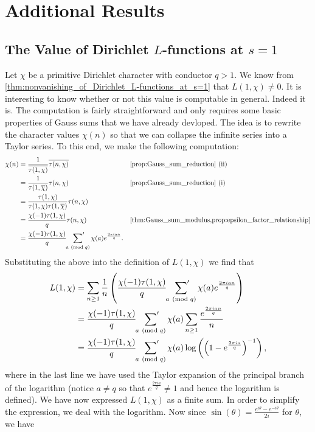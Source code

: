 \documentclass[12pt]{book}
\theoremstyle{definition}\newframedtheorem{method}{Method}
\newcommand{\psum}{\sideset{}{'}\sum}
\newcommand{\tmod}[1]{\ \left(\text{mod }#1\right)}
\renewcommand{\t}{\theta}
\newcommand{\<}{\langle}
\renewcommand{\>}{\rangle}
\newcommand{\conj}{\overline}
\newcommand{\cchi}{\conj{\chi}}
\begin{document}
  \section{Additional Results}
    \subsection*{The Value of Dirichlet \texorpdfstring{$L$}{L}-functions at \texorpdfstring{$s = 1$}{s = 1}}
      Let $\chi$ be a primitive Dirichlet character with conductor $q > 1$. We know from \cref{thm:nonvanishing_of_Dirichlet_L-functions_at_s=1} that $L(1,\chi) \neq 0$. It is interesting to know whether or not this value is computable in general. Indeed it is. The computation is fairly straightforward and only requires some basic properties of Gauss sums that we have already devloped. The idea is to rewrite the character values $\chi(n)$ so that we can collapse the infinite series into a Taylor series. To this end, we make the following computation:
      \begin{align*}
        \chi(n) &= \frac{1}{\conj{\tau(1,\chi)}}\conj{\tau(n,\chi)} && \text{\cref{prop:Gauss_sum_reduction} (ii)} \\
        &= \frac{1}{\tau(1,\cchi)}\tau(n,\chi) && \text{\cref{prop:Gauss_sum_reduction} (i)} \\
        &= \frac{\tau(1,\chi)}{\tau(1,\chi)\tau(1,\cchi)}\tau(n,\chi) \\
        &= \frac{\chi(-1)\tau(1,\chi)}{q}\tau(n,\chi) && \text{\cref{thm:Gauss_sum_modulus,prop:epsilon_factor_relationship}} \\
        &= \frac{\chi(-1)\tau(1,\chi)}{q}\psum_{a \tmod{q}}\chi(a)e^{\frac{2\pi ian}{q}}.
      \end{align*}
      Substituting the above into the definition of $L(1,\chi)$ we find that
      \begin{align*}
        L(1,\chi) &= \sum_{n \ge 1}\frac{1}{n}\left(\frac{\chi(-1)\tau(1,\chi)}{q}\psum_{a \tmod{q}}\chi(a)e^{\frac{2\pi ian}{q}}\right) \\
        &= \frac{\chi(-1)\tau(1,\chi)}{q}\psum_{a \tmod{q}}\chi(a)\sum_{n \ge 1}\frac{e^{\frac{2\pi ian}{q}}}{n} \\
        &= \frac{\chi(-1)\tau(1,\chi)}{q}\psum_{a \tmod{q}}\chi(a)\log\left(\left(1-e^{\frac{2\pi ia}{q}}\right)^{-1}\right),
      \end{align*}
      where in the last line we have used the Taylor expansion of the principal branch of the logarithm (notice $a \neq q$ so that $e^{\frac{2\pi ia}{q}} \neq 1$ and hence the logarithm is defined). We have now expressed $L(1,\chi)$ as a finite sum. In order to simplify the expression, we deal with the logarithm. Now since $\sin(\t) = \frac{e^{i\t}-e^{-i\t}}{2i}$ for $\t$, we have
\end{document}
